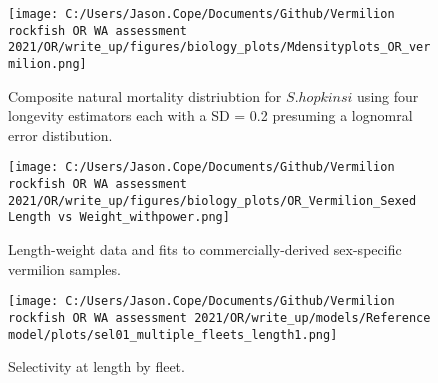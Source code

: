 \documentclass[11pt,
  english,
  a4paper,
]{article}
\begin{document}
\tagmcend\tagstructend


\begin{figure}
\centering
\texttt{[image: C:/Users/Jason.Cope/Documents/Github/Vermilion rockfish OR WA assessment 2021/OR/write\_up/figures/biology\_plots/Mdensityplots\_OR\_vermilion.png]}
\caption{Composite natural mortality distriubtion for {\(S. hopkinsi\)\leavevmode\tagmcend\tagstructend} using four longevity estimators each with a SD = 0.2 presuming a lognomral error distibution.\label{fig:M_composite_dists}}
\end{figure}

\tagmcend\tagstructend


\begin{figure}
\centering
\texttt{[image: C:/Users/Jason.Cope/Documents/Github/Vermilion rockfish OR WA assessment 2021/OR/write\_up/figures/biology\_plots/OR\_Vermilion\_Sexed Length vs Weight\_withpower.png]}
\caption{Length-weight data and fits to commercially-derived sex-specific vermilion samples.\label{fig:len-weight-fit}}
\end{figure}

\tagmcend\tagstructend


\begin{figure}
\centering
\texttt{[image: C:/Users/Jason.Cope/Documents/Github/Vermilion rockfish OR WA assessment 2021/OR/write\_up/models/Reference model/plots/sel01\_multiple\_fleets\_length1.png]}
\caption{Selectivity at length by fleet.\label{fig:selex}}
\end{figure}

\tagmcend\tagstructend

\end{document}
